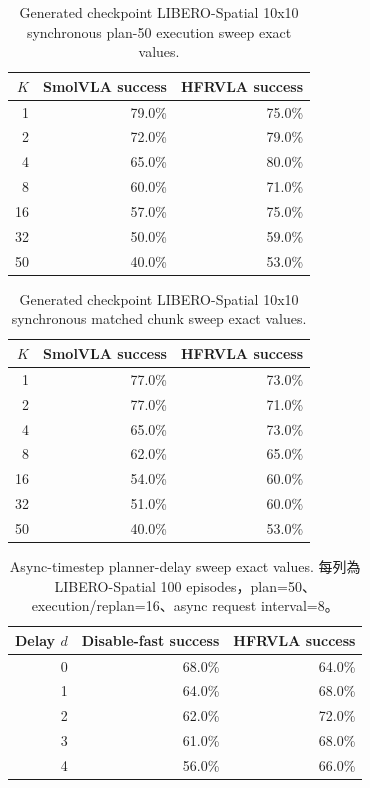 \begin{table}[htbp]
\centering
\caption{Generated checkpoint LIBERO-Spatial 10x10 synchronous plan-50 execution sweep exact values.}
\label{tab:thesis-generated-plan50}
\begin{tabular}{@{}rrr@{}}
\toprule
$K$ & SmolVLA success & HFRVLA success \\
\midrule
1 & 79.0\% & 75.0\% \\
2 & 72.0\% & 79.0\% \\
4 & 65.0\% & 80.0\% \\
8 & 60.0\% & 71.0\% \\
16 & 57.0\% & 75.0\% \\
32 & 50.0\% & 59.0\% \\
50 & 40.0\% & 53.0\% \\
\bottomrule
\end{tabular}
\end{table}

\begin{table}[htbp]
\centering
\caption{Generated checkpoint LIBERO-Spatial 10x10 synchronous matched chunk sweep exact values.}
\label{tab:thesis-generated-matched}
\begin{tabular}{@{}rrr@{}}
\toprule
$K$ & SmolVLA success & HFRVLA success \\
\midrule
1 & 77.0\% & 73.0\% \\
2 & 77.0\% & 71.0\% \\
4 & 65.0\% & 73.0\% \\
8 & 62.0\% & 65.0\% \\
16 & 54.0\% & 60.0\% \\
32 & 51.0\% & 60.0\% \\
50 & 40.0\% & 53.0\% \\
\bottomrule
\end{tabular}
\end{table}

\begin{table}[htbp]
\centering
\caption{Async-timestep planner-delay sweep exact values. 每列為 LIBERO-Spatial 100 episodes，plan=50、execution/replan=16、async request interval=8。}
\label{tab:thesis-async-delay}
\begin{tabular}{@{}rrr@{}}
\toprule
Delay $d$ & Disable-fast success & HFRVLA success \\
\midrule
0 & 68.0\% & 64.0\% \\
1 & 64.0\% & 68.0\% \\
2 & 62.0\% & 72.0\% \\
3 & 61.0\% & 68.0\% \\
4 & 56.0\% & 66.0\% \\
\bottomrule
\end{tabular}
\end{table}

